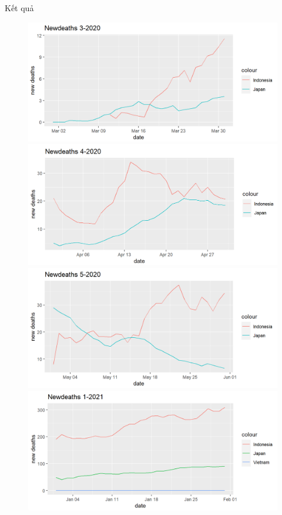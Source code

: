 \documentclass[a4paper]{article}
\theoremstyle{definition}
\begin{document}
\begin{enumerate}[1)]
	
	Kết quả
	\begin{figure}[H]
	    \begin{center}
	        \includegraphics[scale=0.5]{vi/nd_3_2020}
	        \includegraphics[scale=0.5]{vi/nd_4_2020}
		    \includegraphics[scale=0.5]{vi/nd_5_2020}
		    \includegraphics[scale=0.5]{vi/nd_1_2021}

\end{center}
\end{figure}
\end{enumerate}
\end{document}
